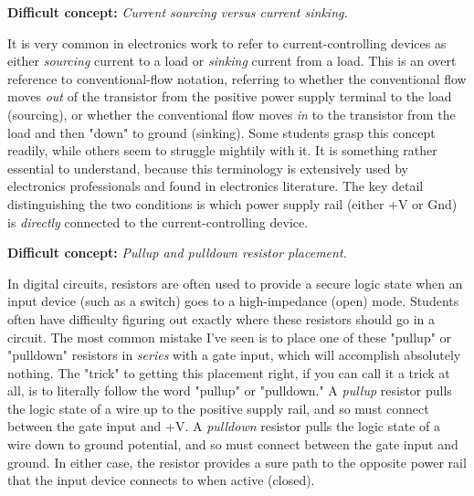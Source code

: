 \vskip 10pt

\noindent
{\bf Difficult concept: } {\it Current sourcing versus current sinking.}

It is very common in electronics work to refer to current-controlling devices as either {\it sourcing} current to a load or {\it sinking} current from a load.  This is an overt reference to conventional-flow notation, referring to whether the conventional flow moves {\it out} of the transistor from the positive power supply terminal to the load (sourcing), or whether the conventional flow moves {\it in} to the transistor from the load and then "down" to ground (sinking).  Some students grasp this concept readily, while others seem to struggle mightily with it.  It is something rather essential to understand, because this terminology is extensively used by electronics professionals and found in electronics literature.  The key detail distinguishing the two conditions is which power supply rail (either +V or Gnd) is {\it directly} connected to the current-controlling device.

\vskip 10pt

\noindent
{\bf Difficult concept: } {\it Pullup and pulldown resistor placement.}

In digital circuits, resistors are often used to provide a secure logic state when an input device (such as a switch) goes to a high-impedance (open) mode.  Students often have difficulty figuring out exactly where these resistors should go in a circuit.  The most common mistake I've seen is to place one of these "pullup" or "pulldown" resistors in {\it series} with a gate input, which will accomplish absolutely nothing.  The "trick" to getting this placement right, if you can call it a trick at all, is to literally follow the word "pullup" or "pulldown."  A {\it pullup} resistor pulls the logic state of a wire up to the positive supply rail, and so must connect between the gate input and +V.  A {\it pulldown} resistor pulls the logic state of a wire down to ground potential, and so must connect between the gate input and ground.  In either case, the resistor provides a sure path to the opposite power rail that the input device connects to when active (closed).

